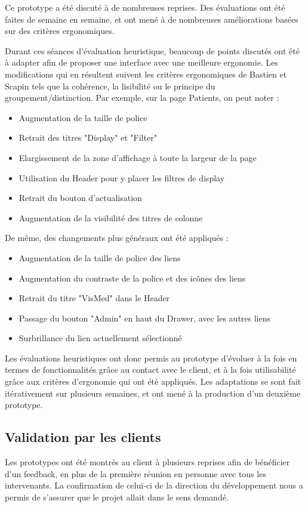 		Ce prototype a été discuté à de nombreuses reprises.
		Des évaluations ont été faites de semaine en semaine, et ont mené à de nombreuses améliorations basées sur des critères ergonomiques.

		Durant ces séances d'évaluation heuristique, beaucoup de points discutés ont été à adapter afin de proposer une interface avec une meilleure ergonomie. Les modifications qui en résultent suivent les critères ergonomiques de Bastien et Scapin\cite{ergoweb} tels que la cohérence, la lisibilité ou le principe du groupement/distinction. Par exemple, sur la page Patients, on peut noter :

		\begin{itemize}
			\item Augmentation de la taille de police
			\item Retrait des titres "Display" et "Filter"
			\item Elargissement de la zone d'affichage à toute la largeur de la page
			\item Utilisation du Header pour y placer les filtres de display
			\item Retrait du bouton d'actualisation
			\item Augmentation de la visibilité des titres de colonne
		\end{itemize}

		De même, des changements plus généraux ont été appliqués :

		\begin{itemize}
			\item Augmentation de la taille de police des liens
			\item Augmentation du contraste de la police et des icônes des liens
			\item Retrait du titre "VisMed" dans le Header
			\item Passage du bouton "Admin" en haut du Drawer, avec les autres liens
			\item Surbrillance du lien actuellement sélectionné
		\end{itemize}

		Les évaluations heuristiques ont donc permis au prototype d'évoluer à la fois en termes de fonctionnalités grâce au contact avec le client, et à la fois utilisabilité grâce aux critères d'ergonomie qui ont été appliqués. Les adaptations se sont fait itérativement sur plusieurs semaines, et ont mené à la production d'un deuxième prototype. 

	\subsection{Validation par les clients}

		Les prototypes ont été montrés au client à plusieurs reprises afin de bénéficier d'un feedback, en plus de la première réunion en personne avec tous les intervenants. La confirmation de celui-ci de la direction du développement nous a permis de s'assurer que le projet allait dans le sens demandé.